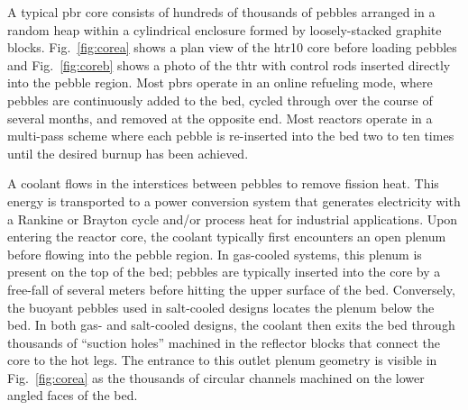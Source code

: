 A typical \gls{pbr} core consists of hundreds of thousands of pebbles arranged in a random heap within a cylindrical enclosure formed by loosely-stacked graphite blocks. Fig.\ \ref{fig:corea} shows a plan view of the \gls{htr10} core before loading pebbles and Fig.\ \ref{fig:coreb} shows a photo of the \gls{thtr} with control rods inserted directly into the pebble region. Most \glspl{pbr} operate in an online refueling mode, where pebbles are continuously added to the bed, cycled through over the course of several months, and removed at the opposite end. Most reactors operate in a multi-pass scheme where each pebble is re-inserted into the bed two to ten times until the desired burnup has been achieved.

A coolant flows in the interstices between pebbles to remove fission heat. This energy is transported to a power conversion system that generates electricity with a Rankine or Brayton cycle and/or process heat for industrial applications. Upon entering the reactor core, the coolant typically first encounters an open plenum before flowing into the pebble region. In gas-cooled systems, this plenum is present on the top of the bed; pebbles are typically inserted into the core by a free-fall of several meters before hitting the upper surface of the bed. Conversely, the buoyant pebbles used in salt-cooled designs locates the plenum below the bed. In both gas- and salt-cooled designs, the coolant then exits the bed through thousands of ``suction holes'' machined in the reflector blocks that connect the core to the hot legs. The entrance to this outlet plenum geometry is visible in Fig.\ \ref{fig:corea} as the thousands of circular channels machined on the lower angled faces of the bed.

